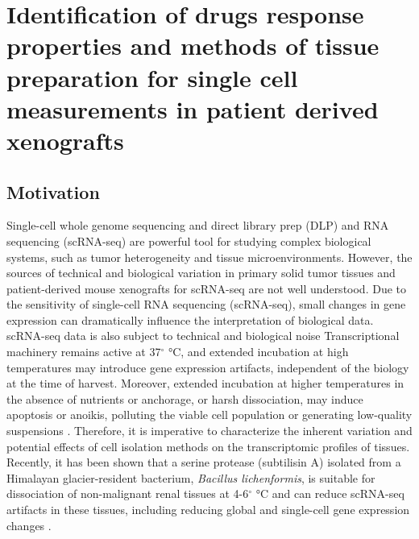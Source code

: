 \chapter{Identification of drugs response properties and methods of tissue preparation for single cell measurements in patient derived xenografts %
}
\label{ch:Chapter 3}

\section{Motivation}
Single-cell whole genome sequencing and direct library prep (DLP) and RNA sequencing (scRNA-seq) are powerful tool for studying complex biological systems, such as tumor heterogeneity and tissue microenvironments. However, the sources of technical and biological variation in primary solid tumor tissues and patient-derived mouse xenografts for scRNA-seq are not well understood.
Due to the sensitivity of single-cell RNA sequencing (scRNA-seq), small changes in gene expression can dramatically influence the interpretation of biological data. scRNA-seq data is also subject to technical and biological noise \cite{potter2018single, stegle2015computational} Transcriptional machinery remains active at 37$^{\circ}$ °C, and extended incubation at high temperatures may introduce gene expression artifacts, independent of the biology at the time of harvest. Moreover, extended incubation at higher temperatures in the absence of nutrients or anchorage, or harsh dissociation, may induce apoptosis or anoikis, polluting the viable cell population or generating low-quality suspensions \cite{volovitz2016non}. Therefore, it is imperative to characterize the inherent variation and potential effects of cell isolation methods on the transcriptomic profiles of tissues. Recently, it has been shown that a serine protease (subtilisin A) isolated from a Himalayan glacier-resident bacterium, \textit{Bacillus lichenformis}, is suitable for dissociation of non-malignant renal tissues at 4-6$^{\circ}$ °C and can reduce scRNA-seq artifacts in these tissues, including reducing global and single-cell gene expression changes \cite{shah2012clonal}.

